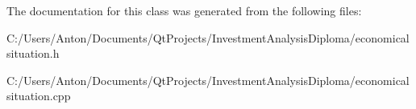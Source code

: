 The documentation for this class was generated from the following files\+:\begin{DoxyCompactItemize}
\item 
C\+:/\+Users/\+Anton/\+Documents/\+Qt\+Projects/\+Investment\+Analysis\+Diploma/economicalsituation.\+h\item 
C\+:/\+Users/\+Anton/\+Documents/\+Qt\+Projects/\+Investment\+Analysis\+Diploma/economicalsituation.\+cpp\end{DoxyCompactItemize}
